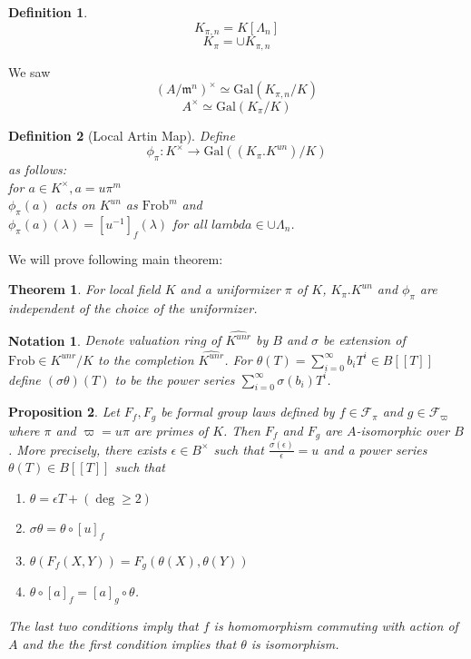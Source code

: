 \documentclass[twoside, 12pt]{iiser-thesis}
\newtheorem{thm}{Theorem}[section]
\newtheorem{prop}[thm]{ Proposition}
\newtheorem{defi}{ Definition}[section]
\newtheorem{notation}{ Notation}[section]
\newcommand{\gal}{\text{Gal}}
\begin{document}
\begin{defi}
$$K_{\pi,n}=K[\Lambda _n]$$ $$ K_\pi = \cup K_{\pi ,n}$$ 
\end{defi}
We saw $$ (A/ \mathfrak m^n ) ^\times \simeq \gal (K_{\pi,n}/K) $$ $$A^\times \simeq \gal(K_\pi /K)$$
\begin{defi}[Local Artin Map]
Define $$ \phi _\pi : K^\times \rightarrow \gal ((K_\pi . K^{un})/K)$$ as follows: \\
for $a \in K^\times ,a=u\pi ^m$ \\
$\phi _\pi (a)$ acts on $K^{un}$ as $\text{Frob} ^m$ and \\
$\phi _\pi (a) (\lambda )= [u^{-1}]_f(\lambda) $ for all $lambda \in \cup \Lambda _n$.
\end{defi}
We will prove following main theorem:
\begin{thm}
For local field $K$ and a uniformizer $\pi$ of $K$, $K_\pi . K^{un}$ and $\phi _\pi$ are independent of the choice of the uniformizer.
\end{thm}
\begin{notation}
Denote valuation ring of $\hat {K^{unr}}$ by $B$ and $\sigma$ be extension of $\text{Frob} \in K^{unr}/K$ to the completion $\hat {K^{unr}}$. For $\theta (T) = \sum _{i=0} ^{\infty} b_i T^i \in B[[T]]$ define $(\sigma \theta )(T)$ to be the power series $\sum _{i=0}^\infty \sigma (b_i)T^i$. 
\end{notation}
\begin{prop}
Let $F_f,F_g$ be formal group laws defined by $f \in \mathcal F _\pi$ and $g\in \mathcal F _{\varpi}$ where $\pi $ and $\varpi = u \pi$ are primes of $K$. Then $F_f$ and $F_g$ are $A$-isomorphic over $B$. More precisely, there exists $\epsilon \in B^ \times $ such that $\frac{\sigma (\epsilon)}{\epsilon}=u$ and a power series $\theta (T) \in B[[T]]$ such that \begin{enumerate}
    \item $\theta = \epsilon T + (\deg \geq 2)$
    \item $\sigma \theta = \theta \circ [u]_f$
    \item $\theta (F_f(X,Y)) = F_g(\theta (X), \theta (Y)) $
    \item $\theta \circ [a]_f=[a]_g\circ \theta$.
\end{enumerate}The last two conditions imply that $f$ is homomorphism commuting with action of $A$ and the 
the first condition implies that $\theta$ is isomorphism.
\end{prop}
\end{document}
